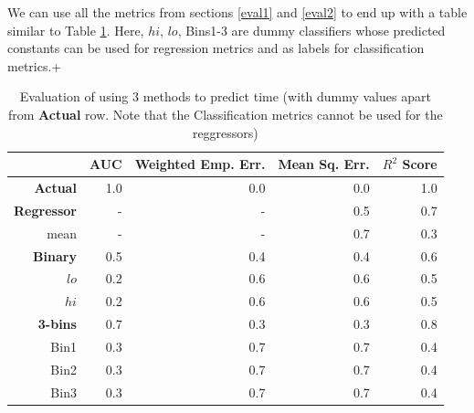 \documentclass[]{article}
\begin{document}
We can use all the metrics from sections \ref{eval1} and \ref{eval2} to end up with a table similar to Table \ref{table:exp2}. Here, $hi$, $lo$, Bins1-3 are dummy classifiers whose predicted constants can be used for regression metrics and as labels for classification metrics.+

\begin{table}
\centering
\caption{Evaluation of using 3 methods to predict time (with dummy values apart from \textbf{Actual} row. Note that the Classification metrics cannot be used for the reggressors)}\label{table:exp2}
\begin{tabular}{r||r|r||r|r} %
& \textbf{AUC}& \textbf{Weighted Emp. Err.}& \textbf{Mean Sq. Err.} & \textbf{$R^{2}$ Score}\\ \hline
\textbf{Actual} & 1.0  & 0.0 & 0.0 & 1.0  \\ \hline \hline
\textbf{Regressor}& - & - & 0.5 & 0.7\\ \hline
mean & - & - & 0.7 & 0.3\\ \hline \hline
\textbf{Binary} & 0.5 & 0.4 & 0.4 & 0.6\\ \hline
$lo$& 0.2 & 0.6 & 0.6 & 0.5\\ \hline
$hi$ & 0.2 & 0.6 & 0.6 & 0.5\\ \hline \hline %
\textbf{3-bins} & 0.7 & 0.3 & 0.3 & 0.8\\ \hline 
Bin1 & 0.3 & 0.7 & 0.7 & 0.4\\ \hline
Bin2 & 0.3 & 0.7 & 0.7 & 0.4\\ \hline
Bin3 & 0.3 & 0.7 & 0.7 & 0.4\\
\end{tabular}
\end{table}


 
\end{document}
